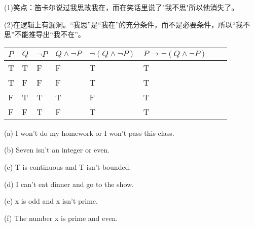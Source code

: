 \documentclass[a4paper, justified]{tufte-handout}
\begin{document}
\begin{solution}
  (1)笑点：笛卡尔说过我思故我在，而在笑话里说了"我不思"所以他消失了。

  (2)在逻辑上有漏洞。“我思”是“我在”的充分条件，而不是必要条件，所以“我不思”不能推导出“我不在”。
\end{solution}

\begin{problem}
\end{problem}

\begin{solution}

  \begin{table}[!h]
    \begin{tabular}{|l|l|l|l|l|l|l|l|}
      \hline
      $P$ & $Q$ & $ \neg P $ & $Q \wedge \neg P$ & $\neg (Q \wedge \neg P) $ & $P\to \neg (Q \wedge \neg P)$ \\ \hline
      T   & T   & F          & F                 & T                         & T                             \\ \hline
      T   & F   & F          & F                 & T                         & T                             \\ \hline
      F   & T   & T          & T                 & F                         & T                             \\ \hline
      F   & F   & T          & F                 & T                         & T                             \\ \hline
    \end{tabular}
  \end{table}
\end{solution}

\begin{problem}
\end{problem}

\begin{solution}

  (a) I won't do my homework or I won't pass this class.

  (b) Seven isn't an integer or even.

  (c) T is continuous and T isn't bounded.

  (d) I can't eat dinner and go to the show.

  (e) x is odd and x isn't prime.

  (f) The number x is prime and even.
\end{solution}
\end{document}
